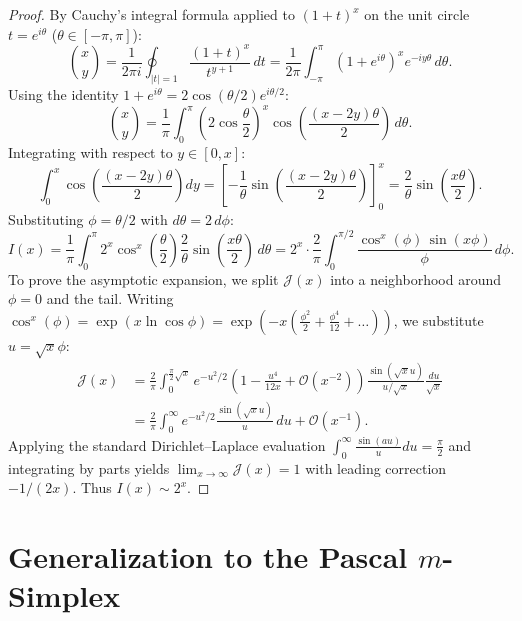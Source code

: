 \documentclass[11pt,a4paper]{article}
\theoremstyle{plain}
\theoremstyle{definition}
\theoremstyle{remark}
\numberwithin{equation}{section}
\begin{document}
\begin{proof}
By Cauchy's integral formula applied to $(1+t)^x$ on the unit circle $t = e^{i\theta}$ ($\theta \in [-\pi, \pi]$):
\begin{equation}
\binom{x}{y} = \frac{1}{2\pi i}\oint_{|t|=1}\frac{(1+t)^x}{t^{y+1}}\,dt = \frac{1}{2\pi}\int_{-\pi}^\pi \left(1 + e^{i\theta}\right)^x e^{-iy\theta}\,d\theta.
\end{equation}
Using the identity $1 + e^{i\theta} = 2\cos(\theta/2)e^{i\theta/2}$:
\begin{equation}
\binom{x}{y} = \frac{1}{\pi}\int_0^\pi \left(2\cos\frac{\theta}{2}\right)^x \cos\left(\frac{(x-2y)\theta}{2}\right)\,d\theta.
\end{equation}
Integrating with respect to $y \in [0, x]$:
\begin{equation}
\int_0^x \cos\left(\frac{(x-2y)\theta}{2}\right)dy = \left[-\frac{1}{\theta}\sin\left(\frac{(x-2y)\theta}{2}\right)\right]_0^x = \frac{2}{\theta}\sin\left(\frac{x\theta}{2}\right).
\end{equation}
Substituting $\phi = \theta/2$ with $d\theta = 2\,d\phi$:
\begin{equation}
I(x) = \frac{1}{\pi}\int_0^\pi 2^x \cos^x\left(\frac{\theta}{2}\right) \frac{2}{\theta}\sin\left(\frac{x\theta}{2}\right)\,d\theta = 2^x \cdot \frac{2}{\pi}\int_0^{\pi/2} \frac{\cos^x(\phi)\,\sin(x\phi)}{\phi}\,d\phi.
\end{equation}
To prove the asymptotic expansion, we split $\mathcal{J}(x)$ into a neighborhood around $\phi = 0$ and the tail. Writing $\cos^x(\phi) = \exp(x \ln \cos \phi) = \exp\left(-x\left(\frac{\phi^2}{2} + \frac{\phi^4}{12} + \dots\right)\right)$, we substitute $u = \sqrt{x}\phi$:
\begin{align*}
\mathcal{J}(x) &= \frac{2}{\pi}\int_0^{\frac{\pi}{2}\sqrt{x}} e^{-u^2/2} \left(1 - \frac{u^4}{12x} + \mathcal{O}(x^{-2})\right) \frac{\sin(\sqrt{x}u)}{u/\sqrt{x}} \frac{du}{\sqrt{x}} \\
&= \frac{2}{\pi}\int_0^\infty e^{-u^2/2} \frac{\sin(\sqrt{x}u)}{u}\,du + \mathcal{O}(x^{-1}).
\end{align*}
Applying the standard Dirichlet--Laplace evaluation $\int_0^\infty \frac{\sin(au)}{u}du = \frac{\pi}{2}$ and integrating by parts \cite{olver1997} yields $\lim_{x\to\infty}\mathcal{J}(x) = 1$ with leading correction $-1/(2x)$. Thus $I(x) \sim 2^x$.
\end{proof}

\section{Generalization to the Pascal \texorpdfstring{$m$}{m}-Simplex}
\end{document}
